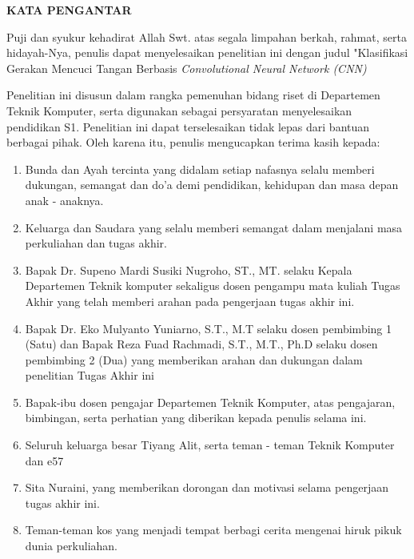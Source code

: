 \begin{center}
  \Large
  \textbf{KATA PENGANTAR}
\end{center}


\vspace{2ex}

Puji dan syukur kehadirat Allah Swt. atas segala limpahan berkah, rahmat, serta hidayah-Nya, penulis dapat menyelesaikan penelitian ini dengan judul "Klasifikasi Gerakan Mencuci Tangan Berbasis \emph{Convolutional Neural Network (CNN)}

Penelitian ini disusun dalam rangka pemenuhan bidang riset di Departemen Teknik Komputer, serta digunakan sebagai persyaratan menyelesaikan pendidikan S1. Penelitian ini dapat terselesaikan tidak lepas dari bantuan berbagai pihak. Oleh karena itu, penulis mengucapkan terima kasih kepada:

\begin{enumerate}[nolistsep]

  \item Bunda dan Ayah tercinta yang didalam setiap nafasnya selalu memberi dukungan, semangat dan do'a demi pendidikan, kehidupan dan masa depan anak - anaknya.

  \item Keluarga dan Saudara yang selalu memberi semangat dalam menjalani masa perkuliahan dan tugas akhir.
  
  \item Bapak Dr. Supeno Mardi Susiki Nugroho, ST., MT. selaku Kepala Departemen Teknik komputer sekaligus dosen pengampu mata kuliah Tugas Akhir yang telah memberi arahan pada pengerjaan tugas akhir ini.

  \item Bapak Dr. Eko Mulyanto Yuniarno, S.T., M.T selaku dosen pembimbing 1 (Satu) dan Bapak Reza Fuad Rachmadi, S.T., M.T., Ph.D selaku dosen pembimbing 2 (Dua) yang memberikan arahan dan dukungan dalam penelitian Tugas Akhir ini
  
  \item Bapak-ibu dosen pengajar Departemen Teknik Komputer, atas pengajaran, bimbingan, serta perhatian yang diberikan kepada penulis selama ini.
  
  \item Seluruh keluarga besar Tiyang Alit, serta teman - teman Teknik Komputer dan e57
  
  \item Sita Nuraini, yang memberikan dorongan dan motivasi selama pengerjaan tugas akhir ini.
  
  \item Teman-teman kos yang menjadi tempat berbagi cerita mengenai hiruk pikuk dunia perkuliahan.

\end{enumerate}

